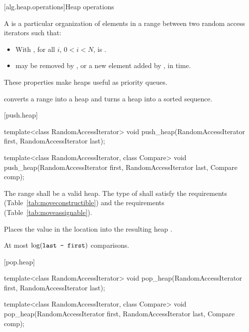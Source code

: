 [alg.heap.operations]{Heap operations}

\pnum
A
is a particular organization of elements in a range between two random access iterators
 such that:

\begin{itemize}
\item With , for all $i$, $0 < i < N$,
is .
\item {}
may be removed by
,
or a new element added by
,
in
time.
\end{itemize}

\pnum
These properties make heaps useful as priority queues.

\pnum
{}
converts a range into a heap and
turns a heap into a sorted sequence.

[push.heap]{}

%
\begin{itemdecl}
template<class RandomAccessIterator>
  void push_heap(RandomAccessIterator first, RandomAccessIterator last);

template<class RandomAccessIterator, class Compare>
  void push_heap(RandomAccessIterator first, RandomAccessIterator last,
                 Compare comp);
\end{itemdecl}

\begin{itemdescr}
\pnum
\requires
The range
shall be a valid heap.
The type of  shall satisfy
the  requirements
(Table~\ref{tab:moveconstructible}) and the
 requirements
(Table~\ref{tab:moveassignable}).

\pnum
\effects
Places the value in the location
into the resulting heap
.

\pnum
\complexity
At most
$\log(\texttt{last - first})$
comparisons.
\end{itemdescr}

[pop.heap]{}

%
\begin{itemdecl}
template<class RandomAccessIterator>
  void pop_heap(RandomAccessIterator first, RandomAccessIterator last);

template<class RandomAccessIterator, class Compare>
  void pop_heap(RandomAccessIterator first, RandomAccessIterator last,
                Compare comp);
\end{itemdecl}

